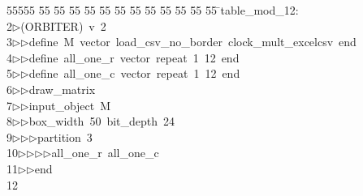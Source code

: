 %
%
\begin{tabbing}
55555 \= 55 \= 55 \= 55 \= 55 \= 55 \= 55 \= 55 \= 55 \= 55 \= 55 \= 55 \= 55 \= \>table\_mod\_12:\\[0pt]
2\>$\triangleright$\>(ORBITER)\ v\ 2\ \\[0pt]
3\>$\triangleright$\>$\triangleright$\>define\ M\ vector\ load\_csv\_no\_border\ clock\_mult\_excelcsv\ end\ \\[0pt]
4\>$\triangleright$\>$\triangleright$\>define\ all\_one\_r\ vector\ repeat\ 1\ 12\ end\ \\[0pt]
5\>$\triangleright$\>$\triangleright$\>define\ all\_one\_c\ vector\ repeat\ 1\ 12\ end\ \\[0pt]
6\>$\triangleright$\>$\triangleright$\>draw\_matrix\ \\[0pt]
7\>$\triangleright$\>$\triangleright$\>input\_object\ M\ \\[0pt]
8\>$\triangleright$\>$\triangleright$\>box\_width\ 50\ bit\_depth\ 24\ \\[0pt]
9\>$\triangleright$\>$\triangleright$\>$\triangleright$\>partition\ 3\ \\[0pt]
10\>$\triangleright$\>$\triangleright$\>$\triangleright$\>$\triangleright$\>all\_one\_r\ all\_one\_c\ \\[0pt]
11\>$\triangleright$\>$\triangleright$\>end\\[0pt]
12\>\end{tabbing}
